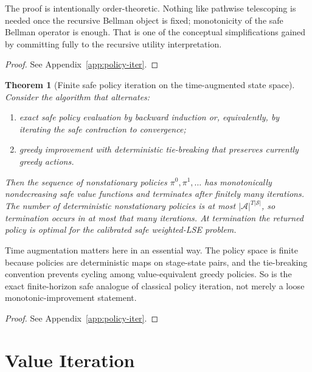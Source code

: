 \documentclass{article}
\newtheorem{theorem}{Theorem}[section]
\theoremstyle{remark}
\newcommand{\cS}{\mathcal{S}}
\newcommand{\cA}{\mathcal{A}}
\begin{document}
The proof is intentionally order-theoretic.
Nothing like pathwise telescoping is needed once the recursive Bellman object is fixed; monotonicity of the safe Bellman operator is enough.
That is one of the conceptual simplifications gained by committing fully to the recursive utility interpretation.

\begin{proof}
See Appendix~\ref{app:policy-iter}.
\end{proof}

\begin{theorem}[Finite safe policy iteration on the time-augmented state space]
\label{thm:policy-iteration}
Consider the algorithm that alternates:
\begin{enumerate}[leftmargin=1.5em,itemsep=2pt]
    \item exact safe policy evaluation by backward induction or, equivalently, by iterating the safe contraction to convergence;
    \item greedy improvement with deterministic tie-breaking that preserves currently greedy actions.
\end{enumerate}
Then the sequence of nonstationary policies $\pi^0,\pi^1,\dots$ has monotonically nondecreasing safe value functions and terminates after finitely many iterations.
The number of deterministic nonstationary policies is at most $|\cA|^{T|\cS|}$, so termination occurs in at most that many iterations.
At termination the returned policy is optimal for the calibrated safe weighted-LSE problem.
\end{theorem}

Time augmentation matters here in an essential way.
The policy space is finite because policies are deterministic maps on stage-state pairs, and the tie-breaking convention prevents cycling among value-equivalent greedy policies.
So  is the exact finite-horizon safe analogue of classical policy iteration, not merely a loose monotonic-improvement statement.

\begin{proof}
See Appendix~\ref{app:policy-iter}.
\end{proof}

\section{Value Iteration}
\label{sec:value-iteration}
\end{document}
